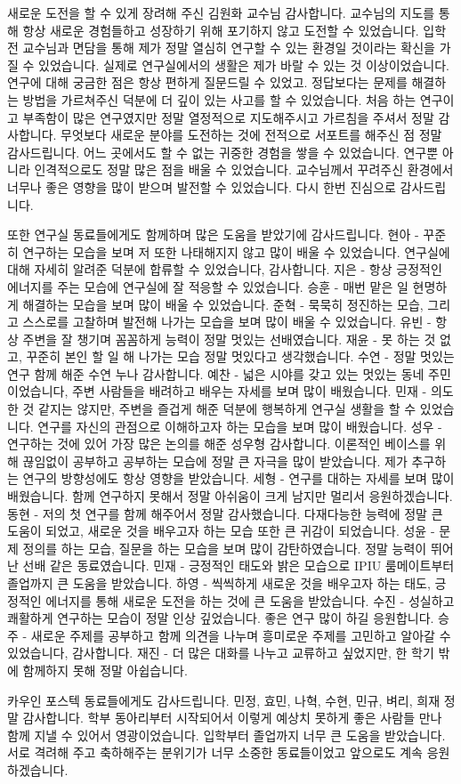 새로운 도전을 할 수 있게 장려해 주신 김원화 교수님 감사합니다.
교수님의 지도를 통해 항상 새로운 경험들하고 성장하기 위해 포기하지 않고 도전할 수 있었습니다.
입학 전 교수님과 면담을 통해 제가 정말 열심히 연구할 수 있는 환경일 것이라는 확신을 가질 수 있었습니다.
실제로 연구실에서의 생활은 제가 바랄 수 있는 것 이상이었습니다.
연구에 대해 궁금한 점은 항상 편하게 질문드릴 수 있었고.
정답보다는 문제를 해결하는 방법을 가르쳐주신 덕분에 더 깊이 있는 사고를 할 수 있었습니다.
처음 하는 연구이고 부족함이 많은 연구였지만 정말 열정적으로 지도해주시고 가르침을 주셔서 정말 감사합니다.
무엇보다 새로운 분야를 도전하는 것에 전적으로 서포트를 해주신 점 정말 감사드립니다.
어느 곳에서도 할 수 없는 귀중한 경험을 쌓을 수 있었습니다.
연구뿐 아니라 인격적으로도 정말 많은 점을 배울 수 있었습니다.
교수님께서 꾸려주신 환경에서 너무나 좋은 영향을 많이 받으며 발전할 수 있었습니다.
다시 한번 진심으로 감사드립니다.

또한 연구실 동료들에게도 함께하며 많은 도움을 받았기에 감사드립니다.
현아 - 꾸준히 연구하는 모습을 보며 저 또한 나태해지지 않고 많이 배울 수 있었습니다. 연구실에 대해 자세히 알려준 덕분에 합류할 수 있었습니다, 감사합니다.
지은 - 항상 긍정적인 에너지를 주는 모습에 연구실에 잘 적응할 수 있었습니다.
승훈 - 매번 맡은 일 현명하게 해결하는 모습을 보며 많이 배울 수 있었습니다.
준혁 - 묵묵히 정진하는 모습, 그리고 스스로를 고찰하며 발전해 나가는 모습을 보며 많이 배울 수 있었습니다.
유빈 - 항상 주변을 잘 챙기며 꼼꼼하게 능력이 정말 멋있는 선배였습니다.
재윤 - 못 하는 것 없고, 꾸준히 본인 할 일 해 나가는 모습 정말 멋있다고 생각했습니다.
수연 - 정말 멋있는 연구 함께 해준 수연 누나 감사합니다.
예찬 - 넓은 시야를 갖고 있는 멋있는 동네 주민이었습니다, 주변 사람들을 배려하고 배우는 자세를 보며 많이 배웠습니다.
민재 - 의도한 것 같지는 않지만, 주변을 즐겁게 해준 덕분에 행복하게 연구실 생활을 할 수 있었습니다. 연구를 자신의 관점으로 이해하고자 하는 모습을 보며 많이 배웠습니다.
성우 - 연구하는 것에 있어 가장 많은 논의를 해준 성우형 감사합니다. 이론적인 베이스를 위해 끊임없이 공부하고 공부하는 모습에 정말 큰 자극을 많이 받았습니다. 제가 추구하는 연구의 방향성에도 항상 영향을 받았습니다.
세형 - 연구를 대하는 자세를 보며 많이 배웠습니다. 함께 연구하지 못해서 정말 아쉬움이 크게 남지만 멀리서 응원하겠습니다.
동현 - 저의 첫 연구를 함께 해주어서 정말 감사했습니다. 다재다능한 능력에 정말 큰 도움이 되었고, 새로운 것을 배우고자 하는 모습 또한 큰 귀감이 되었습니다.
성윤 - 문제 정의를 하는 모습, 질문을 하는 모습을 보며 많이 감탄하였습니다. 정말 능력이 뛰어난 선배 같은 동료였습니다.
민재 - 긍정적인 태도와 밝은 모습으로 IPIU 룸메이트부터 졸업까지 큰 도움을 받았습니다.
하영 - 씩씩하게 새로운 것을 배우고자 하는 태도, 긍정적인 에너지를 통해 새로운 도전을 하는 것에 큰 도움을 받았습니다.
수진 - 성실하고 쾌활하게 연구하는 모습이 정말 인상 깊었습니다. 좋은 연구 많이 하길 응원합니다.
승주 - 새로운 주제를 공부하고 함께 의견을 나누며 흥미로운 주제를 고민하고 알아갈 수 있었습니다, 감사합니다.
재진 - 더 많은 대화를 나누고 교류하고 싶었지만, 한 학기 밖에 함께하지 못해 정말 아쉽습니다.

카우인 포스텍 동료들에게도 감사드립니다. 민정, 효민, 나혁, 수현, 민규, 벼리, 희재 정말 감사합니다.
학부 동아리부터 시작되어서 이렇게 예상치 못하게 좋은 사람들 만나 함께 지낼 수 있어서 영광이었습니다.
입학부터 졸업까지 너무 큰 도움을 받았습니다.
서로 격려해 주고 축하해주는 분위기가 너무 소중한 동료들이었고 앞으로도 계속 응원하겠습니다.